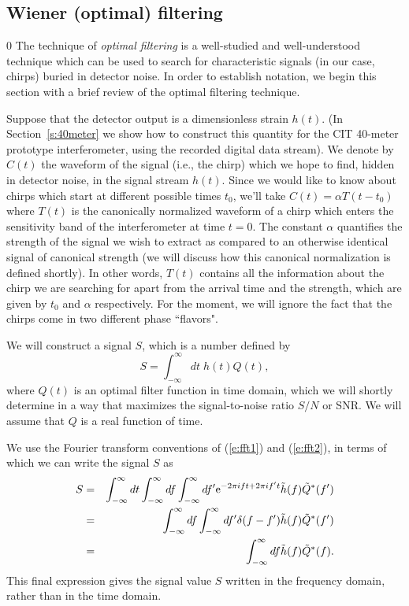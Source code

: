 
\clearpage
\subsection{Wiener (optimal) filtering}
\label{ss:wienerfilt}
\setcounter{equation}0
The technique of {\it optimal filtering} is a well-studied and
well-understood technique which can be used to search for
characteristic signals (in our case, chirps) buried in detector noise.
In order to establish notation, we begin this section with a brief
review of the optimal filtering technique.

Suppose that the detector output is a dimensionless strain $h(t)$.  (In
Section~\ref{s:40meter} we show how to construct this quantity for the
CIT 40-meter prototype interferometer, using the recorded digital data
stream).  We denote by ${C}(t)$ the waveform of the signal (i.e.,
the chirp) which we hope to find, hidden in detector noise, in the
signal stream $h(t)$.  Since we would like to know about chirps which
start at different possible times $t_0$, we'll take ${C}(t) =
\alpha T(t-t_0)$ where $T(t)$ is the canonically normalized waveform 
of a chirp which enters the sensitivity band of the interferometer at 
time $t=0$. The constant $\alpha$ quantifies the strength of the signal
we wish to extract as compared to an otherwise identical signal of 
canonical strength (we will discuss how this canonical normalization
is defined shortly). In other words, $T(t)$ contains all the 
information about the chirp we are searching for apart from the 
arrival time and the strength, which are given by $t_0$ and $\alpha$ 
respectively. For the moment, we will ignore the fact that 
the chirps come in two different phase ``flavors".

We will construct a signal $S$, which is a number defined by
\begin{equation}
S = \int_{-\infty}^\infty dt \;h(t) Q(t),
\end{equation}
where $Q(t)$ is an optimal filter function in time domain, which we
will shortly determine in a way that maximizes the signal-to-noise
ratio $S/N$ or SNR.  We will assume that $Q$ is a real function of
time.

We use the Fourier transform conventions of (\ref{e:fft1}) and
(\ref{e:fft2}), in terms of which we can write the signal $S$ as
\begin{eqnarray}
\nonumber
S &=& \int_{-\infty}^\infty dt  \int_{-\infty}^\infty df  \int_{-\infty}^\infty df'
{\rm e}^{-2 \pi i f t+2 \pi i f' t} \tilde h(f) \tilde Q^* (f')\\
\nonumber
&=& 
\int_{-\infty}^\infty df  \int_{-\infty}^\infty df'
\delta(f-f') \tilde h(f) \tilde Q^* (f')\\
&=& 
\int_{-\infty}^\infty df \tilde h(f) \tilde Q^* (f).
\end{eqnarray}
This final expression gives the signal value $S$ written in the
frequency domain, rather than in the time domain.


